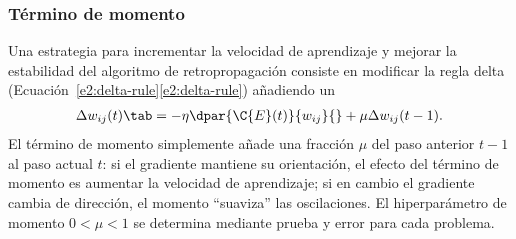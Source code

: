 %
\subsubsection{Término de momento}
%
Una estrategia para incrementar la velocidad de aprendizaje y mejorar
la estabilidad del algoritmo de retropropagación consiste en modificar la
regla delta
(\iflatexml{}Ecuación~\ref{e2:delta-rule}\else\autoref{e2:delta-rule}\fi)
añadiendo un 
%
\begin{align}\label{e2:momentum-term}
  \Delta w_{ij}(t)\tab=-\eta\dpar{\C{E}(t)}{w_{ij}}{} +\mu\Delta
  w_{ij}(t-1).
\end{align}
%
El término de momento simplemente añade una fracción $\mu$ del paso
anterior $t-1$ al paso actual $t$: si el gradiente mantiene su
orientación, el efecto del término de momento es aumentar la velocidad
de aprendizaje; si en cambio el gradiente cambia de dirección, el
momento ``suaviza'' las oscilaciones. El hiperparámetro de momento
$0<\mu<1$ se determina mediante prueba y error para cada problema.
